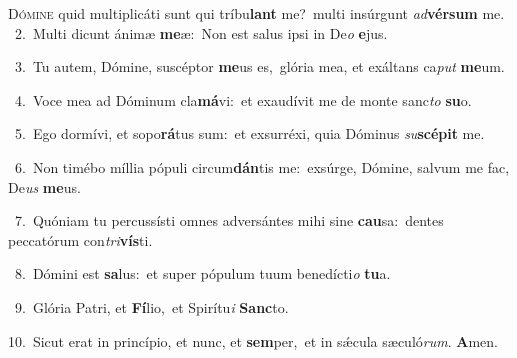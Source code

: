 \lettrine{\initial\textcolor{\initialcolor}{D}}{ómine} quid multiplicáti sunt qui tríbu\textbf{lant} me?~\star multi insúrgunt \textit{ad}\-\textbf{vér}\textbf{sum} me.\\
{\numbfont\textcolor{\numbcolor}{~2.}}~Multi dicunt ánimæ \textbf{me}\-æ:~\star Non est salus ipsi in De\textit{o} \textbf{e}\-jus.\par
{\numbfont\textcolor{\numbcolor}{~3.}}~Tu autem, Dómine, suscéptor \textbf{me}\-us es,~\star glória mea, et exáltans ca\textit{put} \textbf{me}\-um.\par
{\numbfont\textcolor{\numbcolor}{~4.}}~Voce mea ad Dóminum cla\-\textbf{má}\-vi:~\star et exaudívit me de monte sanc\textit{to} \textbf{su}\-o.\par
{\numbfont\textcolor{\numbcolor}{~5.}}~Ego dormívi, et sopo\-\textbf{rá}\-tus sum:~\star et exsurréxi, quia Dóminus \textit{su}\-\textbf{scé}\textbf{pit} me.\par
{\numbfont\textcolor{\numbcolor}{~6.}}~Non timébo míllia pópuli circum\-\textbf{dán}\-tis me:~\star exsúrge, Dómine, salvum me fac, De\textit{us} \textbf{me}\-us.\par
{\numbfont\textcolor{\numbcolor}{~7.}}~Quóniam tu percussísti omnes adversántes mihi sine \textbf{cau}\-sa:~\star dentes peccatórum con\-\textit{tri}\-\textbf{vís}ti.\par
{\numbfont\textcolor{\numbcolor}{~8.}}~Dómini est \textbf{sa}\-lus:~\star et super pópulum tuum benedícti\textit{o} \textbf{tu}\-a.\par
{\numbfont\textcolor{\numbcolor}{~9.}}~Glória Patri, et \textbf{Fí}\-lio,~\star et Spirítu\textit{i} \textbf{Sanc}\-to.\par
{\numbfont\textcolor{\numbcolor}{10.}}~Sicut erat in princípio, et nunc, et \textbf{sem}\-per,~\star et in sǽcula sæculó\-\textit{rum}\-. \textbf{A}\-men.\par
